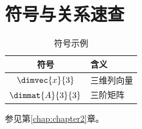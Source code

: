 \chapter{符号与关系速查}
\label{app:symbols}

\begin{table}[htbp]
  \centering
  \caption{符号示例}\label{tab:symbols}
  \begin{tabular}{cl}
    \toprule
    符号 & 含义 \\
    \midrule
    \(\dimvec{x}{3}\) & 三维列向量 \\
    \(\dimmat{A}{3}{3}\) & 三阶矩阵 \\
    \bottomrule
  \end{tabular}
\end{table}

参见第\ref{chap:chapter2}章。
